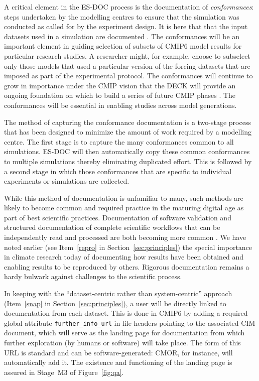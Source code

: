 \documentclass[gmd,manuscript]{copernicus}
\begin{document}
A critical element in the ES-DOC process is the documentation of
\emph{conformances}: steps undertaken by the modelling centres to
ensure that the simulation was conducted as called for by the
experiment design. It is here that that the input datasets used in a
simulation are documented \citep[e.g., the version of each of the
forcing datasets, see][]{ref:duracketal2018}. The conformances will be
an important element in guiding selection of subsets of CMIP6 model
results for particular research studies. A researcher might, for
example, choose to subselect only those models that used a particular
version of the forcing datasets that are imposed as part of the
experimental protocol. The conformances will continue to grow in
importance under the CMIP vision that the DECK will provide an ongoing
foundation on which to build a series of future CMIP phases
\citep[shown schematically in Figure~1 of][]{ref:eyringetal2016a}. The
conformances will be essential in enabling studies across model
generations.

The method of capturing the conformance documentation is a two-stage
process that has been designed to minimize the amount of work required
by a modelling centre. The first stage is to capture the many
conformances common to all simulations. ES-DOC will then automatically
copy these common conformances to multiple simulations thereby
eliminating duplicated effort. This is followed by a second stage in
which those conformances that are specific to individual experiments
or simulations are collected.

While this method of documentation is unfamiliar to many, such methods
are likely to become common and required practice in the maturing
digital age as part of best scientific practices. Documentation of
software validation \citep[see e.g][]{ref:peng2011} and structured
documentation of complete scientific workflows that can be
independently read and processed are both becoming more common
\citep[see the special issue on the ``Geoscience Paper of the
Future'', ][]{ref:davidetal2016}. We have noted earlier
(see Item~\ref{repro} in Section~\ref{sec:principles}) the special
importance in climate research today of documenting how results have
been obtained and enabling results to be reproduced by others.
Rigorous documentation remains a hardy bulwark against challenges to
the scientific process.

In keeping with the ``dataset-centric rather than system-centric''
approach (Item~\ref{snap} in Section~\ref{sec:principles}), a user
will be directly linked to documentation from each dataset. This is
done in CMIP6 by
adding a required global attribute \texttt{further\_info\_url} in file
headers pointing to the associated CIM document, which will serve as
the landing page for documentation from which further exploration (by
humans or software) will take place. The form of this URL is standard
and can be software-generated: CMOR, for instance, will automatically
add it. The existence and functioning of the landing page is assured
in Stage~M3 of Figure~\ref{fig:qa}.
\end{document}
